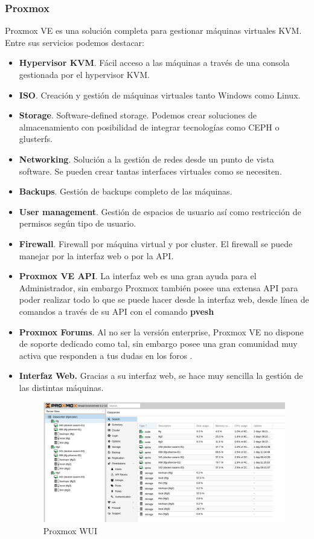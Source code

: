 		\subsubsection{Proxmox}
		\begin{paragraph}
			Proxmox VE es una solución completa para gestionar máquinas virtuales KVM. Entre sus servicios podemos destacar:
			\begin{itemize}
				\item \textbf{Hypervisor KVM}. Fácil acceso a las máquinas a través de una consola gestionada por el hypervisor KVM.
				\item \textbf{ISO}. Creación y gestión de máquinas virtuales tanto Windows como Linux.
				\item \textbf{Storage}. Software-defined storage. Podemos crear soluciones de almacenamiento con posibilidad de integrar tecnologías como CEPH o glusterfs.
				\item \textbf{Networking}. Solución a la gestión de redes desde un punto de vista software. Se pueden crear tantas interfaces virtuales como se necesiten.
				\item \textbf{Backups}. Gestión de backups completo de las máquinas.
				\item \textbf{User management}. Gestión de espacios de usuario así como restricción de permisos según tipo de usuario.
				\item \textbf{Firewall}. Firewall por máquina virtual y por cluster. El firewall se puede manejar por la interfaz web o por la API.
				\item \textbf{Proxmox VE API}. La interfaz web es una gran ayuda para el Administrador, sin embargo Proxmox también posee una extensa API \cite{ProxmoxAPI:online} para poder realizar todo lo que se puede hacer desde la interfaz web, desde línea de comandos a través de su API con el comando \textbf{pvesh}
				\item \textbf{Proxmox Forums}. Al no ser la versión enterprise, Proxmox VE no dispone de soporte dedicado como tal, sin embargo posee una gran comunidad muy activa que responden a tus dudas en los foros \cite{ProxmoxForum:online}.
				\item \textbf{Interfaz Web.} Gracias a su interfaz web, se hace muy sencilla la gestión de las distintas máquinas.
				\begin{figure}[!hbt]
					\centering
					\includegraphics[scale=0.355]{imagenes/Diseno/proxmox_wui.png}
					\caption[Proxmox WUI]{Proxmox WUI} 
					\label{Proxmox WUI}
				\end{figure}
			\end{itemize}
 

\end{paragraph}
